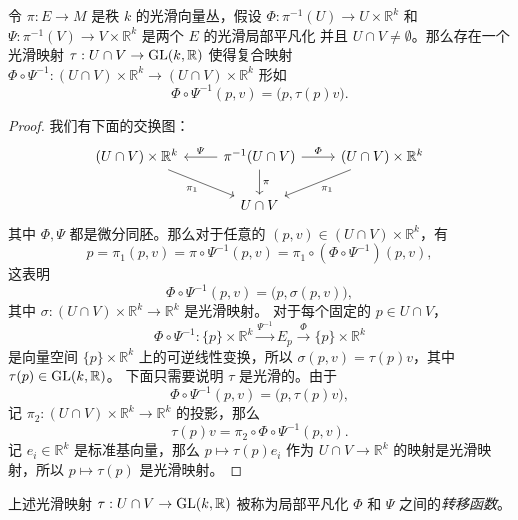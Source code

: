 \begin{lemma}
  令 $\pi:E\to M$ 是秩 $k$ 的光滑向量丛，假设 $\varPhi:\pi^{-1}(U)\to U\times \mathbb{R}^k$
  和 $\varPsi:\pi^{-1}(V)\to V\times \mathbb{R}^k$ 是两个 $E$ 的光滑局部平凡化
  并且 $U\cap V\neq\emptyset$。那么存在一个光滑映射 $\tau:U\cap V\to \operatorname{GL}(k,\mathbb{R})$
  使得复合映射 $\varPhi\circ\varPsi^{-1}:(U\cap V)\times \mathbb{R}^k\to (U\cap V)\times \mathbb{R}^k$
  形如
  \[
    \varPhi\circ\varPsi^{-1}(p,v)=\bigl(p,\tau(p)v\bigr)  .
  \]
\end{lemma}
\begin{proof}
  我们有下面的交换图：
  \[
    \begin{tikzcd}[column sep=2.4em]
      (U\cap V)\times \mathbb{R}^k\arrow[dr,"\pi_1"']
      &
      \pi^{-1}(U\cap V)\arrow[l,"\varPsi"']\arrow[r,"\varPhi"]\arrow[d,"\pi"]
      &
      (U\cap V)\times \mathbb{R}^k\arrow[dl,"\pi_1"]\\
      & 
      U\cap V
      &
    \end{tikzcd}  
  \]
  其中 $\varPhi,\varPsi$ 都是微分同胚。那么对于任意的
  $(p,v)\in(U\cap V)\times \mathbb{R}^k$，有
  \[
    p=\pi_1(p,v)=\pi\circ\varPsi^{-1}(p,v)=\pi_1\circ(\varPhi\circ\varPsi^{-1})
    (p,v),  
  \]
  这表明
  \[
    \varPhi\circ\varPsi^{-1}(p,v)=\bigl(p,\sigma(p,v)\bigr),
  \]
  其中 $\sigma:(U\cap V)\times \mathbb{R}^k\to \mathbb{R}^k$ 是光滑映射。
  对于每个固定的 $p\in U\cap V$，
  \[ 
    \varPhi\circ\varPsi^{-1}:\{p\}\times \mathbb{R}^k\xrightarrow{\varPsi^{-1}}
    E_p\xrightarrow{\varPhi}\{p\}\times \mathbb{R}^k
  \]
  是向量空间 $\{p\}\times \mathbb{R}^k$ 上的可逆线性变换，所以
  $\sigma(p,v)=\tau(p)v$，其中 $\tau(p)\in\operatorname{GL}(k,\mathbb{R})$。
  下面只需要说明 $\tau$ 是光滑的。由于
  \[
    \varPhi\circ\varPsi^{-1}(p,v)=\bigl(p,\tau(p)v\bigr),
  \]
  记 $\pi_2:(U\cap V)\times \mathbb{R}^k\to \mathbb{R}^k$ 的投影，那么
  \[
    \tau(p)v=\pi_2\circ\varPhi\circ\varPsi^{-1}(p,v).
  \]
  记 $e_i\in \mathbb{R}^k$ 是标准基向量，那么 $p\mapsto \tau(p)e_i$
  作为 $U\cap V\to \mathbb{R}^k$ 的映射是光滑映射，所以 $p\mapsto \tau(p)$
  是光滑映射。
\end{proof} 

上述光滑映射 $\tau:U\cap V\to\operatorname{GL}(k,\mathbb{R})$ 被称为局部平凡化
$\varPhi$ 和 $\varPsi$ 之间的\emph{转移函数}。

